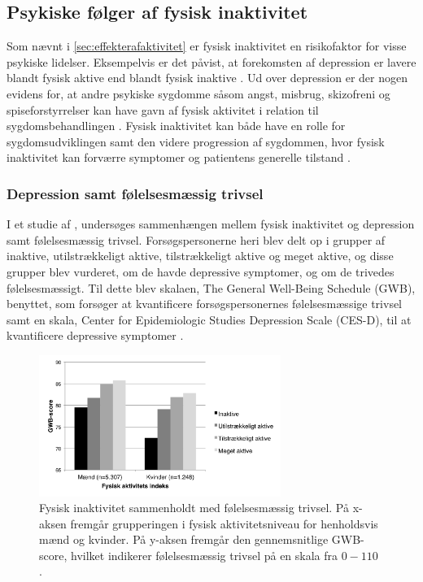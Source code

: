 \subsection{Psykiske følger af fysisk inaktivitet}
Som nævnt i \autoref{sec:effekterafaktivitet} er fysisk inaktivitet en risikofaktor for visse psykiske lidelser. Eksempelvis er det påvist, at forekomsten af depression er lavere blandt fysisk aktive end blandt fysisk inaktive \citep{motionsraad2007}. Ud over depression er der nogen evidens for, at andre psykiske sygdomme såsom angst, misbrug, skizofreni og spiseforstyrrelser kan have gavn af fysisk aktivitet i relation til sygdomsbehandlingen \citep{kessing2016}. Fysisk inaktivitet kan både have en rolle for sygdomsudviklingen samt den videre progression af sygdommen, hvor fysisk inaktivitet kan forværre symptomer og patientens generelle tilstand \citep{motionsraad2007,kessing2016}.

\subsubsection{Depression samt følelsesmæssig trivsel}
I et studie af \citeauthor{galper2006}, undersøges sammenhængen mellem fysisk inaktivitet og depression samt følelsesmæssig trivsel. Forsøgspersonerne heri blev delt op i grupper af inaktive, utilstrækkeligt aktive, tilstrækkeligt aktive og meget aktive, og disse grupper blev vurderet, om de havde depressive symptomer, og om de trivedes følelsesmæssigt. 
Til dette blev skalaen, The General Well-Being Schedule (GWB), benyttet, som forsøger at kvantificere forsøgspersonernes følelsesmæssige trivsel samt en skala, Center for Epidemiologic Studies Depression Scale (CES-D), til at kvantificere depressive symptomer \citep{galper2006}.

\begin{figure}[H]
\centering
\includegraphics[width=0.7\textwidth]{figures/inaktivitet_gwb}
\caption{Fysisk inaktivitet sammenholdt med følelsesmæssig trivsel. På x-aksen fremgår grupperingen i fysisk aktivitetsniveau for henholdsvis mænd og kvinder. På y-aksen fremgår den gennemsnitlige GWB-score, hvilket indikerer følelsesmæssig trivsel på en skala fra $0-110$ \citep{galper2006}.}
\label{fig:inaktivitet_gwb}
\end{figure}

